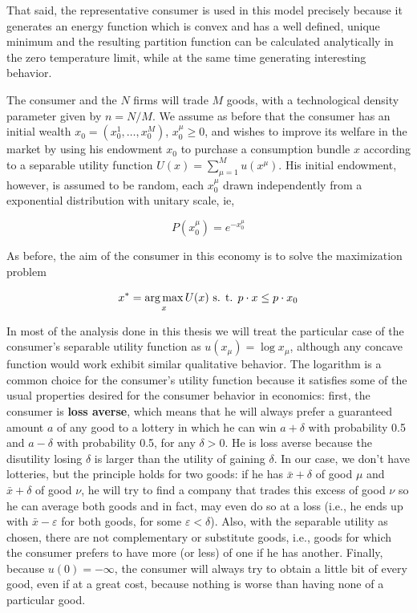 That said, the representative consumer is used in this model precisely
because it generates an energy function which is convex and has a
well defined, unique minimum and the resulting partition function can
be calculated analytically in the zero temperature limit, while at the
same time generating interesting behavior.

The consumer and the $N$ firms will trade $M$ goods, with a
technological density parameter given by $n = N/M$. We assume as
before that the consumer has an initial wealth
$x_0 = (x_0^1, \ldots, x_0^M)$, $x_0^\mu \geq 0$, and wishes to
improve its welfare in the market by using his endowment $x_0$ to
purchase a consumption bundle $x$ according to a separable utility
function $U(x) = \sum_{\mu=1}^M u(x^\mu)$. His initial endowment,
however, is assumed to be random, each $x_0^\mu$ drawn independently
from a exponential distribution with unitary scale, ie,

\begin{equation}
  \label{eq:1}
  P(x_0^\mu) = e^{-x_0^\mu}
\end{equation}

As before, the aim of the consumer in this economy is to solve the
maximization problem

\begin{equation}
  \label{eq:3}
  x^\ast = \operatorname*{arg\,max}_{x} U(x) \text{ s. t. } p\cdot x \leq p\cdot x_0
\end{equation}

In most of the analysis done in this thesis we will treat the
particular case of the consumer's separable utility function as
$u(x_\mu) = \log x_\mu$, although any concave function would work
exhibit similar qualitative behavior. The logarithm is a common choice for the consumer's utility function because it satisfies some of the usual properties desired for the consumer behavior in economics: first, the consumer is \textbf{loss averse}, which means that he will
always prefer a guaranteed amount $a$ of any good to a lottery in
which he can win $a + \delta$ with probability 0.5 and $a - \delta$
with probability 0.5, for any $\delta > 0$. He is loss averse because
the disutility losing $\delta$ is larger than the utility of gaining
$\delta$. In our case, we don't have lotteries, but the principle
holds for two goods: if he has $\bar{x} + \delta$ of good $\mu$ and
$\bar{x} + \delta$ of good $\nu$, he will try to find a company that
trades this excess of good $\nu$ so he can average both goods and in
fact, may even do so at a loss (i.e., he ends up with
$\bar{x} - \varepsilon$ for both goods, for some
$\varepsilon < \delta$). Also, with the separable utility as chosen,
there are not complementary or substitute goods, i.e., goods for which
the consumer prefers to have more (or less) of one if he has
another. Finally, because $u(0) = -\infty$, the consumer will always
try to obtain a little bit of every good, even if at a great cost,
because nothing is worse than having none of a particular good.

